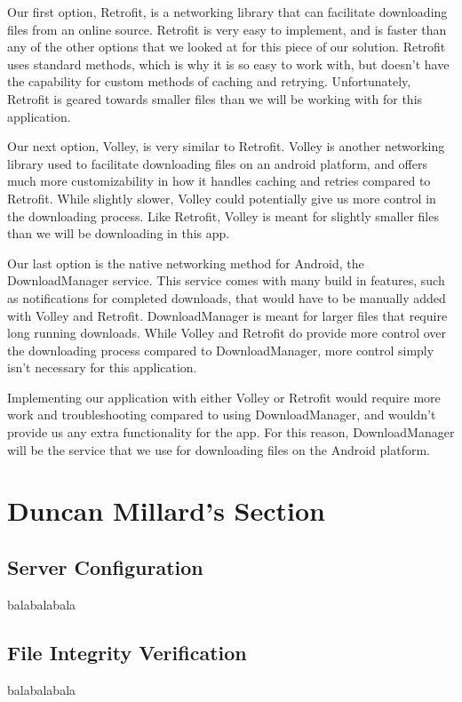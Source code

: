 \documentclass[letterpaper, 10pt,titlepage]{article}
\begin{document}
Our first option, Retrofit, is a networking library that can facilitate downloading files from an online source. Retrofit is very easy to implement, and is faster than any of the other options that we looked at for this piece of our solution. Retrofit uses standard methods, which is why it is so easy to work with, but doesn’t have the capability for custom methods of caching and retrying. Unfortunately, Retrofit is geared towards smaller files than we will be working with for this application. 


Our next option, Volley, is very similar to Retrofit. Volley is another networking library used to facilitate downloading files on an android platform, and offers much more customizability in how it handles caching and retries compared to Retrofit. While slightly slower, Volley could potentially give us more control in the downloading process. Like Retrofit, Volley is meant for slightly smaller files than we will be downloading in this app.


Our last option is the native networking method for Android, the DownloadManager service. This service comes with many build in features, such as notifications for completed downloads, that would have to be manually added with Volley and Retrofit. DownloadManager is meant for larger files that require long running downloads. While Volley and Retrofit do provide more control over the downloading process compared to DownloadManager, more control simply isn’t necessary for this application. 


Implementing our application with either Volley or Retrofit would require more work and troubleshooting compared to using DownloadManager, and wouldn’t provide us any extra functionality for the app. For this reason, DownloadManager will be the service that we use for downloading files on the Android platform. 

\vspace{0.5cm}

\section{Duncan Millard's Section}
\subsection{Server Configuration}
balabalabala



\subsection{File Integrity Verification }
balabalabala
\end{document}
